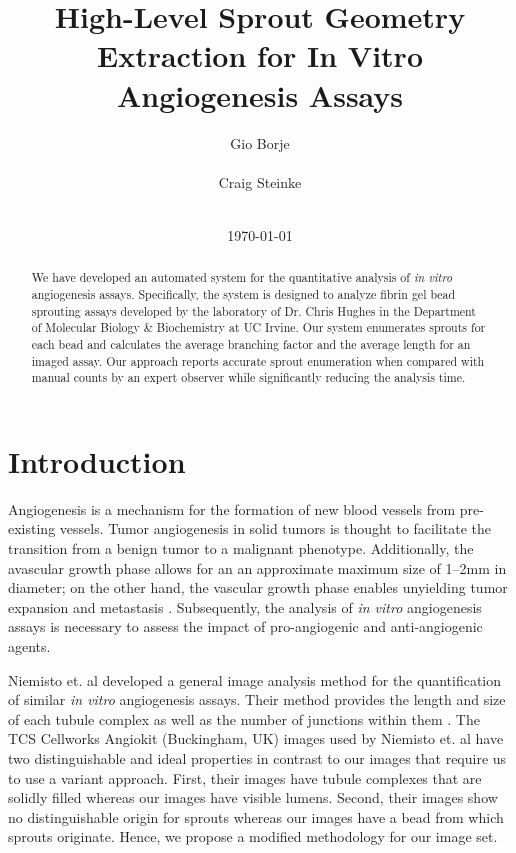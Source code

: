 \documentclass{sig-alternate}
\newcommand{\invitro}{\emph{in vitro} }
\begin{document}
\title{High-Level Sprout Geometry Extraction for In Vitro Angiogenesis Assays}
\author{
	\alignauthor Gio Borje \\
		 \\
	\alignauthor Craig Steinke \\
		 \\
}
\date{\today}
\maketitle

\begin{abstract}
	We have developed an automated system for the quantitative analysis of
	\invitro angiogenesis assays. Specifically, the system is designed to
	analyze fibrin gel bead sprouting assays developed by the laboratory
	of Dr. Chris Hughes in the Department of Molecular Biology \&
	Biochemistry at UC Irvine. Our system enumerates sprouts for each
	bead and calculates the average branching factor and the average
	length for an imaged assay. Our approach reports accurate sprout
	enumeration when compared with manual counts by an expert observer
	while significantly reducing the analysis time.
\end{abstract}

\section{Introduction} %
\label{sec:Introduction}
	Angiogenesis is a mechanism for the formation of new blood vessels
	from pre-existing vessels. Tumor angiogenesis in solid tumors is
	thought to facilitate the transition from a benign tumor to a
	malignant phenotype. Additionally, the avascular growth phase allows
	for an an approximate maximum size of 1--2mm in diameter; on the other
	hand, the vascular growth phase enables unyielding tumor expansion
	and metastasis \cite{kerbel99}. Subsequently, the analysis of
	\invitro angiogenesis assays is necessary to assess the impact of
	pro-angiogenic and anti-angiogenic agents.

	Niemisto et. al developed a general image analysis method for the
	quantification of similar \invitro angiogenesis assays. Their method
	provides the length and size of each tubule complex as well as the number
	of junctions within them \cite{niemisto05}. The TCS Cellworks Angiokit
	(Buckingham, UK) images used by Niemisto et. al have two distinguishable
	and ideal properties in contrast to our images that require us to use a
	variant approach. First, their images have tubule complexes that are
	solidly filled whereas our images have visible lumens. Second, their images
	show no distinguishable origin for sprouts whereas our images have a bead
	from which sprouts originate. Hence, we propose a modified methodology for
	our image set.
\end{document}
